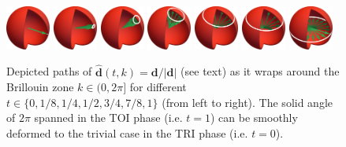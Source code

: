 \begin{figure}[ht]
    \centering
    \includegraphics[width=0.13\textwidth]{figures/ssh_deformed_normalized_bloch_vector_t0_000.jpg}
    \includegraphics[width=0.13\textwidth]{figures/ssh_deformed_normalized_bloch_vector_t0_125.jpg}
    \includegraphics[width=0.13\textwidth]{figures/ssh_deformed_normalized_bloch_vector_t0_250.jpg}
    \includegraphics[width=0.13\textwidth]{figures/ssh_deformed_normalized_bloch_vector_t0_500.jpg}
    \includegraphics[width=0.13\textwidth]{figures/ssh_deformed_normalized_bloch_vector_t0_750.jpg}
    \includegraphics[width=0.13\textwidth]{figures/ssh_deformed_normalized_bloch_vector_t0_825.jpg}
    \includegraphics[width=0.13\textwidth]{figures/ssh_deformed_normalized_bloch_vector_t1_000.jpg}
    \caption{Depicted paths of $\hat{\bm d}(t,k)={\bm d}/|{\bm d}|$ (see text) as it wraps around the Brillouin zone $k\in(0,2\pi]$ for different $t\in\{0,1/8,1/4,1/2,3/4,7/8,1\}$ (from left to right). The solid angle of $2\pi$ spanned in the TOI phase (i.e. $t=1$) can be smoothly deformed to the trivial case in the TRI phase (i.e. $t=0$).}
    \label{fig:ssh_deformed}
\end{figure}

